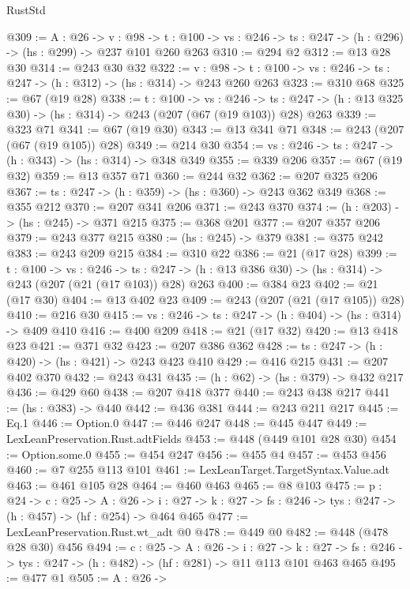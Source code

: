 \begin{lexlean}{RustStd}
\begin{coremodule}
{\begin{coremodule}
{@309 := {A : @26} ->
  {v : @98} ->
  {t : @100} -> {vs : @246} -> {ts : @247} -> (h : @296) -> (hs : @299) -> @237 @101 @260 @263
@310 := @294 @2
@312 := @13 @28 @30
@314 := @243 @30 @32
@322 := {v : @98} ->
  {t : @100} -> {vs : @246} -> {ts : @247} -> (h : @312) -> (hs : @314) -> @243 @260 @263
@323 := @310 @68
@325 := @67 (@19 @28)
@338 := {t : @100} ->
  {vs : @246} ->
  {ts : @247} -> (h : @13 @325 @30) -> (hs : @314) -> @243 (@207 (@67 (@19 @103)) @28) @263
@339 := @323 @71
@341 := @67 (@19 @30)
@343 := @13 @341 @71
@348 := @243 (@207 (@67 (@19 @105)) @28)
@349 := @214 @30
@354 := {vs : @246} -> {ts : @247} -> (h : @343) -> (hs : @314) -> @348 @349
@355 := @339 @206
@357 := @67 (@19 @32)
@359 := @13 @357 @71
@360 := @244 @32
@362 := @207 @325 @206
@367 := {ts : @247} -> (h : @359) -> (hs : @360) -> @243 @362 @349
@368 := @355 @212
@370 := @207 @341 @206
@371 := @243 @370
@374 := (h : @203) -> (hs : @245) -> @371 @215
@375 := @368 @201
@377 := @207 @357 @206
@379 := @243 @377 @215
@380 := (hs : @245) -> @379
@381 := @375 @242
@383 := @243 @209 @215
@384 := @310 @22
@386 := @21 (@17 @28)
@399 := {t : @100} ->
  {vs : @246} ->
  {ts : @247} -> (h : @13 @386 @30) -> (hs : @314) -> @243 (@207 (@21 (@17 @103)) @28) @263
@400 := @384 @23
@402 := @21 (@17 @30)
@404 := @13 @402 @23
@409 := @243 (@207 (@21 (@17 @105)) @28)
@410 := @216 @30
@415 := {vs : @246} -> {ts : @247} -> (h : @404) -> (hs : @314) -> @409 @410
@416 := @400 @209
@418 := @21 (@17 @32)
@420 := @13 @418 @23
@421 := @371 @32
@423 := @207 @386 @362
@428 := {ts : @247} -> (h : @420) -> (hs : @421) -> @243 @423 @410
@429 := @416 @215
@431 := @207 @402 @370
@432 := @243 @431
@435 := (h : @62) -> (hs : @379) -> @432 @217
@436 := @429 @60
@438 := @207 @418 @377
@440 := @243 @438 @217
@441 := (hs : @383) -> @440
@442 := @436 @381
@444 := @243 @211 @217
@445 := Eq.{1}
@446 := Option.{0}
@447 := @446 @247
@448 := @445 @447
@449 := LexLeanPreservation.Rust.adtFields
@453 := @448 (@449 @101 @28 @30)
@454 := Option.some.{0}
@455 := @454 @247
@456 := @455 @4
@457 := @453 @456
@460 := @7 @255 @113 @101
@461 := LexLeanTarget.TargetSyntax.Value.adt
@463 := @461 @105 @28
@464 := @460 @463
@465 := @8 @103
@475 := {p : @24} ->
  {c : @25} ->
  {A : @26} ->
  {i : @27} -> {k : @27} -> {fs : @246} -> {tys : @247} -> (h : @457) -> (hf : @254) -> @464 @465
@477 := LexLeanPreservation.Rust.wt_adt @0
@478 := @449 @0
@482 := @448 (@478 @28 @30) @456
@494 := {c : @25} ->
  {A : @26} ->
  {i : @27} ->
  {k : @27} -> {fs : @246} -> {tys : @247} -> (h : @482) -> (hf : @281) -> @11 @113 @101 @463 @465
@495 := @477 @1
@505 := {A : @26} ->
}
\end{coremodule}}
\end{coremodule}
\end{lexlean}
